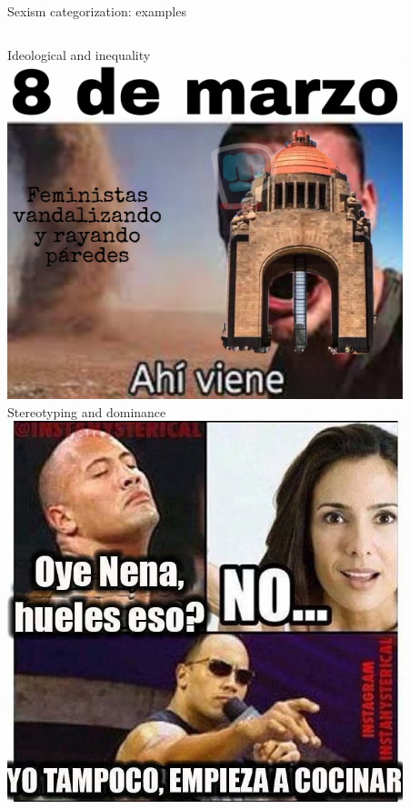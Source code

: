 \begin{frame}{Sexism categorization: examples}
\begin{columns}
    \begin{column}{0.33\textwidth}
        \centering
        Ideological and inequality
        \includegraphics[width=0.9\textwidth]{images/idelogocial.jpeg}
        \vfill
        Stereotyping and dominance
        \includegraphics[width=0.9\textwidth]{images/dominance.jpeg}
    \end{column}
    \begin{column}{0.33\textwidth}

\end{column}
\end{columns}
\end{frame}
